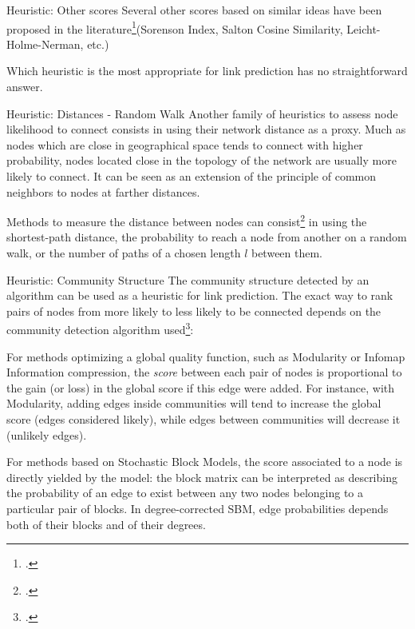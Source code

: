 \documentclass[a4paper,11pt]{book}
\begin{document}
\begin{textbox}{Heuristic: Other scores}
Several other scores based on similar ideas have been proposed in the literature\footcite{zhou2009predicting}(Sorenson Index, Salton Cosine Similarity, Leicht-Holme-Nerman, etc.)

Which heuristic is the most appropriate for link prediction has no straightforward answer. 


\end{textbox}



\begin{textbox}{Heuristic: Distances - Random Walk}
Another family of heuristics to assess node likelihood to connect consists in using their network distance as a proxy. Much as nodes which are close in geographical space tends to connect with higher probability, nodes located close in the topology of the network are usually more likely to connect. It can be seen as an extension of the principle of common neighbors to nodes at farther distances.

Methods to measure the distance between nodes can consist\footcite{lichtenwalter2010new} in using the shortest-path distance, the probability to reach a node from another on a random walk, or the number of paths of a chosen length $l$ between them.


\end{textbox}






\begin{textbox}{Heuristic: Community Structure}
The community structure detected by an algorithm can be used as a heuristic for link prediction. The exact way to rank pairs of nodes from more likely to less likely to be connected depends on the community detection algorithm used\footcite{ghasemian2019evaluating}:

For methods optimizing a global quality function, such as Modularity or Infomap Information compression, the \textit{score} between each pair of nodes is proportional to the gain (or loss) in the global score if this edge were added. For instance, with Modularity, adding edges inside communities will tend to increase the global score (edges considered likely), while edges between communities will decrease it (unlikely edges).

For methods based on Stochastic Block Models, the score associated to a node is directly yielded by the model: the block matrix can be interpreted as describing the probability of an edge to exist between any two nodes belonging to a particular pair of blocks. In degree-corrected SBM, edge probabilities depends both of their blocks and of their degrees.


\end{textbox}
\end{document}
